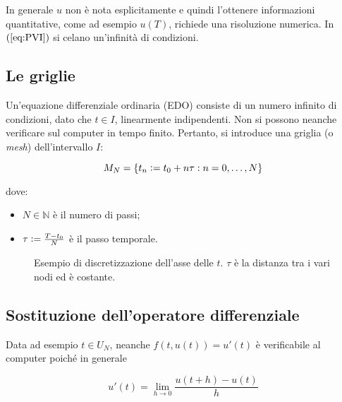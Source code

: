 \documentclass[hidelinks, 10pt]{report}
\begin{document}
In generale $ u $ non \`e nota esplicitamente e quindi l'ottenere informazioni quantitative, come ad esempio $ u(T) $, richiede una risoluzione numerica. In $ (\ref{eq:PVI}) $ si celano un'infinit\`a di condizioni.

\subsection{Le griglie}
Un'equazione differenziale ordinaria (EDO) consiste di un numero infinito di condizioni, dato che $ t \in I $, linearmente indipendenti. Non si possono neanche verificare sul computer in tempo finito. Pertanto, si introduce una griglia (o \emph{mesh}) dell'intervallo $ I $:

\[ M_{N} = \{ t_{n} \vcentcolon= t_{0} + n \tau : n = 0, \dotsc, N \} \]

dove:
\begin{itemize}
\item $ N \in \mathbb{N} $ \`e il numero di passi;
\item $ \tau \vcentcolon= \frac{T - t_{0}}{N} $ \`e il passo temporale.
\end{itemize}

\begin{center}
\begin{figure}[H]

\caption{Esempio di discretizzazione dell'asse delle $ t $. $ \tau $ \`e la distanza tra i vari nodi ed \`e costante.}
\end{figure}
\end{center}

\subsection{Sostituzione dell'operatore differenziale}
Data ad esempio $ t \in U_{N} $, neanche $ f \left( t, u(t) \right) = u'(t) $ \`e verificabile al computer poich\'e in generale

\[ u'(t) = \lim\limits_{h \to 0} \frac{u(t + h) - u(t)}{h} \]
\end{document}
